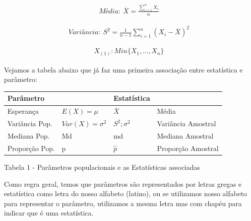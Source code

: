 \documentclass[
  letterpaper,
  DIV=11,
  numbers=noendperiod]{scrartcl}
\begin{document}
\[\begin{array}{ccc}
Média: \ \overline{X}=\frac{\sum_{i=1}^{n} X_i}{n}
\end{array}\]

\[\begin{array}{ccc}
Variância: \ S^{2}= \frac{1}{n-1} \sum_{i=1}^{n} (X_i - \overline{X})^{2}
\end{array}\]

\[\begin{array}{ccc}
X_{(1)}: Min\{X_1, ..., X_n\}
\end{array}\]

Vejamos a tabela abaixo que já faz uma primeira associação entre
estatística e parâmetro:

\begin{longtable}[]{@{}
  >{\raggedright\arraybackslash}p{}
  >{\raggedright\arraybackslash}p{}
  >{\raggedright\arraybackslash}p{}
  >{\raggedright\arraybackslash}p{}@{}}
\toprule\noalign{}
\begin{minipage}[b]{\linewidth}\raggedright
Parâmetro
\end{minipage} & \begin{minipage}[b]{\linewidth}\raggedright
\end{minipage} & \begin{minipage}[b]{\linewidth}\raggedright
Estatística
\end{minipage} & \begin{minipage}[b]{\linewidth}\raggedright
\end{minipage} \\
\midrule\noalign{}
\endhead
\bottomrule\noalign{}
\endlastfoot
Esperança & \(E(X)=\mu\) & \(\bar{X}\) & Média \\
Variância Pop. & \(Var(X)=\sigma^2\) & \(S^2;\sigma^2\) & Variância
Amostral \\
Mediana Pop. & Md & md & Mediana Amostral \\
Proporção Pop. & p & \(\hat{p}\) & Proporção Amostral \\
\end{longtable}

{Tabela 1 - Parâmetros populacionais e as Estatísticas associadas}

Como regra geral, temos que parâmetros são representados por letras
gregas e estatística como letra do nosso alfabeto (latino), ou se
utilizamos nosso alfabeto para representar o parâmetro, utilizamos a
mesma letra mas com chapéu para indicar que é uma estatística.
\end{document}
